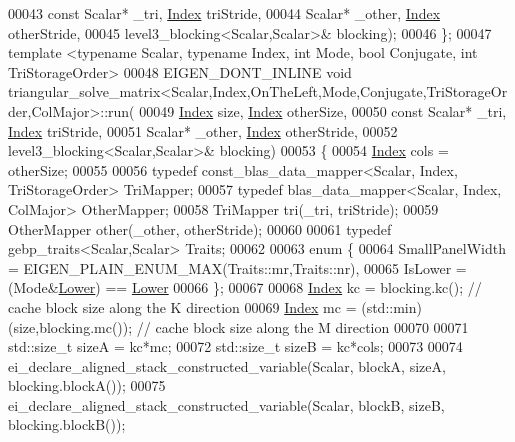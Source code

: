 \begin{DoxyCode}
00043     \textcolor{keyword}{const} Scalar* \_tri, \hyperlink{namespace_eigen_a62e77e0933482dafde8fe197d9a2cfde}{Index} triStride,
00044     Scalar* \_other, \hyperlink{namespace_eigen_a62e77e0933482dafde8fe197d9a2cfde}{Index} otherStride,
00045     level3\_blocking<Scalar,Scalar>& blocking);
00046 \};
00047 \textcolor{keyword}{template} <\textcolor{keyword}{typename} Scalar, \textcolor{keyword}{typename} Index, \textcolor{keywordtype}{int} Mode, \textcolor{keywordtype}{bool} Conjugate, \textcolor{keywordtype}{int} TriStorageOrder>
00048 EIGEN\_DONT\_INLINE \textcolor{keywordtype}{void} 
      triangular\_solve\_matrix<Scalar,Index,OnTheLeft,Mode,Conjugate,TriStorageOrder,ColMajor>::run(
00049     \hyperlink{namespace_eigen_a62e77e0933482dafde8fe197d9a2cfde}{Index} size, \hyperlink{namespace_eigen_a62e77e0933482dafde8fe197d9a2cfde}{Index} otherSize,
00050     \textcolor{keyword}{const} Scalar* \_tri, \hyperlink{namespace_eigen_a62e77e0933482dafde8fe197d9a2cfde}{Index} triStride,
00051     Scalar* \_other, \hyperlink{namespace_eigen_a62e77e0933482dafde8fe197d9a2cfde}{Index} otherStride,
00052     level3\_blocking<Scalar,Scalar>& blocking)
00053   \{
00054     \hyperlink{namespace_eigen_a62e77e0933482dafde8fe197d9a2cfde}{Index} cols = otherSize;
00055 
00056     \textcolor{keyword}{typedef} const\_blas\_data\_mapper<Scalar, Index, TriStorageOrder> TriMapper;
00057     \textcolor{keyword}{typedef} blas\_data\_mapper<Scalar, Index, ColMajor> OtherMapper;
00058     TriMapper tri(\_tri, triStride);
00059     OtherMapper other(\_other, otherStride);
00060 
00061     \textcolor{keyword}{typedef} gebp\_traits<Scalar,Scalar> Traits;
00062 
00063     \textcolor{keyword}{enum} \{
00064       SmallPanelWidth   = EIGEN\_PLAIN\_ENUM\_MAX(Traits::mr,Traits::nr),
00065       IsLower = (Mode&\hyperlink{group__enums_gga39e3366ff5554d731e7dc8bb642f83cda891792b8ed394f7607ab16dd716f60e6}{Lower}) == \hyperlink{group__enums_gga39e3366ff5554d731e7dc8bb642f83cda891792b8ed394f7607ab16dd716f60e6}{Lower}
00066     \};
00067 
00068     \hyperlink{namespace_eigen_a62e77e0933482dafde8fe197d9a2cfde}{Index} kc = blocking.kc();                   \textcolor{comment}{// cache block size along the K direction}
00069     \hyperlink{namespace_eigen_a62e77e0933482dafde8fe197d9a2cfde}{Index} mc = (std::min)(size,blocking.mc());  \textcolor{comment}{// cache block size along the M direction}
00070 
00071     std::size\_t sizeA = kc*mc;
00072     std::size\_t sizeB = kc*cols;
00073 
00074     ei\_declare\_aligned\_stack\_constructed\_variable(Scalar, blockA, sizeA, blocking.blockA());
00075     ei\_declare\_aligned\_stack\_constructed\_variable(Scalar, blockB, sizeB, blocking.blockB());

\end{DoxyCode}
